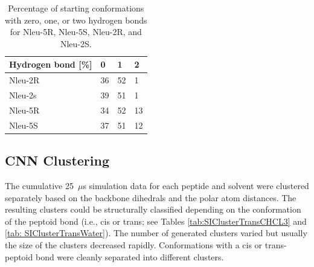 \begin{table}[h!]
\centering
\caption{Percentage of starting conformations with zero, one, or two hydrogen bonds for
Nleu-5R, Nleu-5S, Nleu-2R, and Nleu-2S.}
\label{tab: SIhbondAmountRatios}
  \begin{adjustbox}{max width=\textwidth}
\begin{tabular}{llll}
Hydrogen bond {[}\%{]} & 0      & 1          & 2        \\
    \hline
Nleu-2R        & 36             & 52         &  1       \\
Nleu-2s        & 39             & 51         &  1       \\
Nleu-5R        & 34             & 52         &  13      \\
Nleu-5S        & 37             & 51         &  12  \\
   \hline

\end{tabular}%
\end{adjustbox}
\end{table}

\FloatBarrier

\subsection{CNN Clustering} 
The cumulative 25~$\mu$s simulation data for each peptide and solvent were clustered separately based on the backbone dihedrals and the polar atom distances. The resulting clusters could be structurally classified depending on the conformation of the peptoid bond (i.e., cis or trans; see Tables \ref{tab:SIClusterTransCHCL3} and \ref{tab: SIClusterTransWater}). The number of generated clusters varied but usually the size of the clusters decreased rapidly. Conformations with a cis or trans-peptoid bond were cleanly separated into different clusters.

